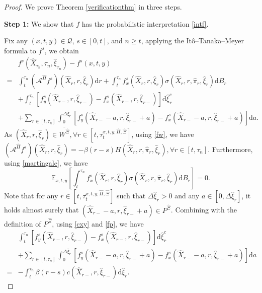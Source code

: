 \documentclass[10pt,a4paper]{amsart}
\begin{document}
\begin{proof}
We prove Theorem \ref{verificationthm} in three steps.

{\bf Step 1:} We show that $f$ has the probabilistic interpretation \eqref{intf}.

Fix any $(x,t,y)\in\mathcal{Q}$, $s\in[0,t]$, and $n\ge t$, applying the It\^{o}--Tanaka--Meyer formula to $f^{s}$, we obtain
\begin{equation}
\begin{aligned}
&f^{s}\left(\hat{X}_{\tau_{n}},\tau_{n},\hat{\xi}_{\tau_{n}}\right)-f^{s}(x,t,y)\\=&\int_{t}^{\tau_{n}}\left(\mathcal{A}^{\hat{\Pi}}f^{s}\right)\left(\hat{X}_{r},r,\hat{\xi}_{r}\right)\mathrm{d}r+\int_{t}^{\tau_{n}}f^{s}_{x}\left(\hat{X}_{r},r,\hat{\xi}_{r}\right)\sigma\left(\hat{X}_{r},r,\hat\pi_r,\hat{\xi}_{r}\right)\mathrm{d}B_{r}\\
&+\int_{t}^{\tau_{n}}\left[f^{s}_{y}\left(\hat{X}_{r-},r,\hat{\xi}_{r-}\right)-f^{s}_{x}\left(\hat{X}_{r-},r,\hat{\xi}_{r-}\right)\right]\mathrm{d}\hat{\xi}_{r}^{c}\\
&+\sum\limits_{r\in[t,\tau_{n}]}\int_{0}^{\Delta\hat{\xi}_{r}}\left[f^{s}_{y}\left(\hat{X}_{r-}-a,r,\hat{\xi}_{r-}+a\right)-f^{s}_{x}\left(\hat{X}_{r-}-a,r,\hat{\xi}_{r-}+a\right)\right]\mathrm{d}a.
\end{aligned}
\label{fsito}\end{equation}
As $\left(\hat{X}_{r},r,\hat{\xi}_{r}\right)\in\overline{W^{\hat{\Xi}}}, \forall r\in[t,\tau^{x,t,y;\hat{\Pi},\hat{\Xi}}_{t}]$, using \eqref{fw}, we have $\left(\mathcal{A}^{\hat{\Pi}}f^{s}\right)\left(\hat{X}_{r},r,\hat{\xi}_{r}\right)=-\beta(r-s)H\left(\hat{X}_{r},r,\hat\pi_r,\hat{\xi}_{r}\right),  \forall r\in[t,\tau_n]$. Furthermore, using \eqref{martingale}, we have 
\begin{equation}
\mathbb{E}_{x,t,y}\left[\int_{t}^{\tau_{n}}f^{s}_{x}\left(\hat{X}_{r},r,\hat{\xi}_{r}\right)\sigma\left(\hat{X}_{r},r,\hat\pi_r,\hat{\xi}_{r}\right)\mathrm{d}B_{r}\right]=0.
\nonumber\end{equation}
Note that for any $r\in[t,\tau^{x,t,y;\hat{\Pi},\hat{\Xi}}_{t}]$ such that $\Delta\hat{\xi}_{r}>0$ and any $a\in[0,\Delta\hat{\xi}_{r}]$, it holds almost surely that $(\hat{X}_{r-}-a,r,\hat{\xi}_{r-}+a)\in P^{\hat{\Xi}}$. Combining with the definition of $P^{\hat{\Xi}}$, using \eqref{cxy} and \eqref{fp}, we have 
\begin{equation}\begin{aligned}
&\int_{t}^{\tau_{n}}\left[f^{s}_{y}\left(\hat{X}_{r-},r,\hat{\xi}_{r-}\right)-f^{s}_{x}\left(\hat{X}_{r-},r,\hat{\xi}_{r-}\right)\right]\mathrm{d}\hat{\xi}_{r}^{c}\\
&+\sum\limits_{r\in[t,\tau_{n}]}\int_{0}^{\Delta\hat{\xi}_{r}}\left[f^{s}_{y}\left(\hat{X}_{r-}-a,r,\hat{\xi}_{r-}+a\right)-f^{s}_{x}\left(\hat{X}_{r-}-a,r,\hat{\xi}_{r-}+a\right)\right]\mathrm{d}a\\=&
-\int_{t}^{\tau_{n}}\beta(r-s)c\left(\hat{X}_{r-},r,\hat{\xi}_{r-}\right)\mathrm{d}\hat{\xi}_{r}.
\end{aligned}\nonumber\end{equation}


\end{proof}
\end{document}
